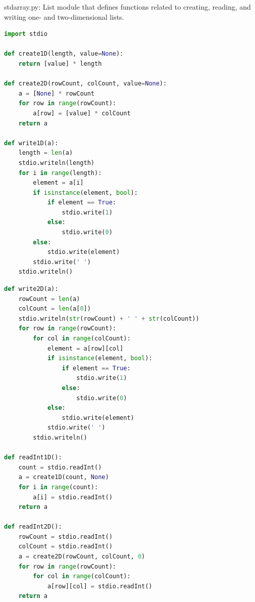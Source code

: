 \documentclass[8pt,a4paper,compress,handout]{beamer}
\begin{document}
\begin{frame}[fragile]
\begin{framed}
\tiny stdarray.py: List module that defines functions related to creating, reading,
and writing one- and two-dimensional lists.
\end{framed}

\begin{lstlisting}[language=Python]
import stdio

def create1D(length, value=None):
    return [value] * length

def create2D(rowCount, colCount, value=None):
    a = [None] * rowCount
    for row in range(rowCount):
        a[row] = [value] * colCount
    return a

def write1D(a):
    length = len(a)
    stdio.writeln(length)
    for i in range(length):
        element = a[i]
        if isinstance(element, bool):
            if element == True:
                stdio.write(1)
            else:
                stdio.write(0) 
        else:
            stdio.write(element)
        stdio.write(' ')
    stdio.writeln()
\end{lstlisting}
\end{frame}


\begin{frame}[fragile]
\begin{lstlisting}[language=Python]
def write2D(a):
    rowCount = len(a)
    colCount = len(a[0])
    stdio.writeln(str(rowCount) + ' ' + str(colCount))
    for row in range(rowCount):
        for col in range(colCount):
            element = a[row][col]
            if isinstance(element, bool):
                if element == True:
                    stdio.write(1)
                else:
                    stdio.write(0)
            else:
                stdio.write(element)
            stdio.write(' ')
        stdio.writeln()

def readInt1D():
    count = stdio.readInt()
    a = create1D(count, None)
    for i in range(count):
        a[i] = stdio.readInt()
    return a

def readInt2D():
    rowCount = stdio.readInt()
    colCount = stdio.readInt()
    a = create2D(rowCount, colCount, 0)
    for row in range(rowCount):
        for col in range(colCount):
            a[row][col] = stdio.readInt()
    return a
\end{lstlisting}
\end{frame}
\end{document}
